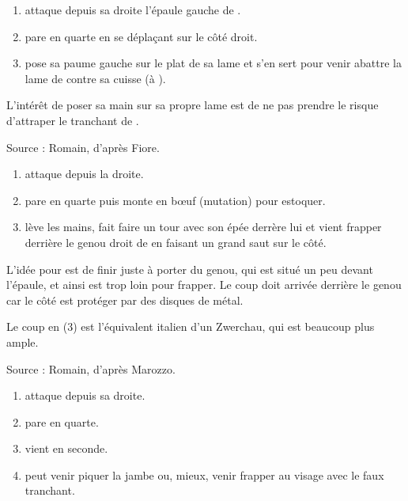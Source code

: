 \begin{technique}

\begin{enumerate}
	\item \A attaque depuis sa droite l'épaule gauche de \D.
	\item \D pare en quarte en se déplaçant sur le côté droit.
	\item \D pose sa paume gauche sur le plat de sa lame et s'en sert pour venir abattre la lame de \A contre sa cuisse (à \D).
\end{enumerate}

L'intérêt de poser sa main sur sa propre lame est de ne pas prendre le risque d'attraper le tranchant de \A.

Source : Romain, d'après Fiore.

\end{technique}


\begin{technique}

\begin{enumerate}
	\item \A attaque depuis la droite.
	\item \D pare en quarte puis monte en bœuf (mutation) pour estoquer.
	\item \A lève les mains, fait faire un tour avec son épée derrère lui et vient frapper derrière le genou droit de \D en faisant un grand saut sur le côté.
\end{enumerate}

L'idée pour \A est de finir juste à porter du genou, qui est situé un peu devant l'épaule, et ainsi \D est trop loin pour frapper.
Le coup doit arrivée derrière le genou car le côté est protéger par des disques de métal.

Le coup en (3) est l'équivalent italien d'un Zwerchau, qui est beaucoup plus ample.

Source : Romain, d'après Marozzo.

\end{technique}


\begin{technique}

\begin{enumerate}
	\item \A attaque depuis sa droite.
	\item \D pare en quarte.
	\item \D vient en seconde.
	\item \D peut venir piquer la jambe ou, mieux, venir frapper au visage avec le faux tranchant.
\end{enumerate}

\end{technique}


